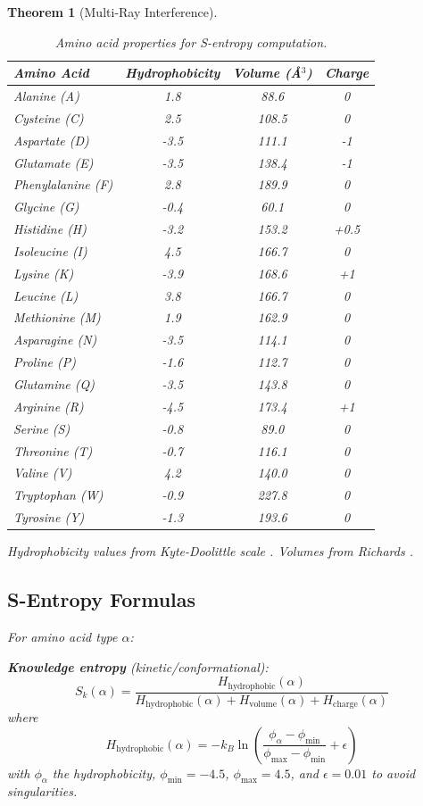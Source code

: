 \documentclass[11pt,a4paper]{article}
\newtheorem{theorem}{Theorem}[section]
\begin{document}
\begin{theorem}[Multi-Ray Interference]
\begin{table}[H]
\centering
\caption{Amino acid properties for S-entropy computation.}
\small
\begin{tabular}{lccc}
\hline
\textbf{Amino Acid} & \textbf{Hydrophobicity} & \textbf{Volume} (\AA$^3$) & \textbf{Charge} \\
\hline
Alanine (A) & 1.8 & 88.6 & 0 \\
Cysteine (C) & 2.5 & 108.5 & 0 \\
Aspartate (D) & -3.5 & 111.1 & -1 \\
Glutamate (E) & -3.5 & 138.4 & -1 \\
Phenylalanine (F) & 2.8 & 189.9 & 0 \\
Glycine (G) & -0.4 & 60.1 & 0 \\
Histidine (H) & -3.2 & 153.2 & +0.5 \\
Isoleucine (I) & 4.5 & 166.7 & 0 \\
Lysine (K) & -3.9 & 168.6 & +1 \\
Leucine (L) & 3.8 & 166.7 & 0 \\
Methionine (M) & 1.9 & 162.9 & 0 \\
Asparagine (N) & -3.5 & 114.1 & 0 \\
Proline (P) & -1.6 & 112.7 & 0 \\
Glutamine (Q) & -3.5 & 143.8 & 0 \\
Arginine (R) & -4.5 & 173.4 & +1 \\
Serine (S) & -0.8 & 89.0 & 0 \\
Threonine (T) & -0.7 & 116.1 & 0 \\
Valine (V) & 4.2 & 140.0 & 0 \\
Tryptophan (W) & -0.9 & 227.8 & 0 \\
Tyrosine (Y) & -1.3 & 193.6 & 0 \\
\hline
\end{tabular}
\end{table}

Hydrophobicity values from Kyte-Doolittle scale \cite{Kyte1982}. Volumes from Richards \cite{Richards1977}.

\subsection{S-Entropy Formulas}

For amino acid type $\alpha$:

\textbf{Knowledge entropy} (kinetic/conformational):
\begin{equation}
S_k(\alpha) = \frac{H_{\text{hydrophobic}}(\alpha)}{H_{\text{hydrophobic}}(\alpha) + H_{\text{volume}}(\alpha) + H_{\text{charge}}(\alpha)}
\end{equation}
where
\begin{equation}
H_{\text{hydrophobic}}(\alpha) = -k_B \ln\left(\frac{\phi_{\alpha} - \phi_{\min}}{\phi_{\max} - \phi_{\min}} + \epsilon\right)
\end{equation}
with $\phi_\alpha$ the hydrophobicity, $\phi_{\min} = -4.5$, $\phi_{\max} = 4.5$, and $\epsilon = 0.01$ to avoid singularities.


\end{theorem}
\end{document}
